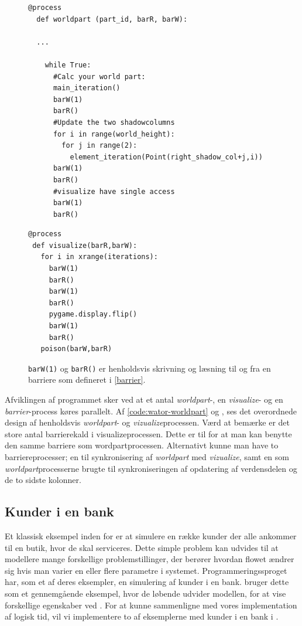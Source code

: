 \begin{figure}[hbtp]
\begin{minipage}{\linewidth}
\begin{lstlisting}[label=code:wator-worldpart,caption=Uddrag af processen 
  \emph{worldpart} i Wator]
  @process
  def worldpart (part_id, barR, barW):
  
  ...
  
    while True:
      #Calc your world part:
      main_iteration()
      barW(1)
      barR()
      #Update the two shadowcolumns
      for i in range(world_height):
        for j in range(2):
          element_iteration(Point(right_shadow_col+j,i))
      barW(1)
      barR()
      #visualize have single access
      barW(1)
      barR()
\end{lstlisting}

\begin{lstlisting}[label=code:wator-visualize,caption=Processen 
  \emph{visualize} i Wator]
@process
 def visualize(barR,barW):
   for i in xrange(iterations):
     barW(1)
     barR()
     barW(1)
     barR()
     pygame.display.flip()
     barW(1)
     barR()
   poison(barW,barR)
\end{lstlisting}

\end{minipage}
\caption[test]{\texttt{barW(1)} og \texttt{barR()} er henholdsvis skrivning og læsning til og 
fra en barriere som defineret i \cref{barrier}.}
\end{figure}
Afviklingen af programmet sker ved at et antal \emph{worldpart}-, en 
\emph{visualize}- og en \emph{barrier}-process køres parallelt. Af 
\autoref{code:wator-worldpart} og \pageref{code:wator-visualize}, ses det 
overordnede design af henholdsvis \emph{worldpart}- og 
\emph{vizualize}processen.  Værd at bemærke er det store antal barrierekald i 
visualizeprocessen. Dette er til for at man kan benytte den samme barriere som 
wordpartprocessen. Alternativt kunne man have to barriereprocesser; en til 
synkronisering af \emph{worldpart} med \emph{vizualize}, samt en som 
\emph{worldpart}processerne brugte til synkroniseringen af opdatering af 
verdensdelen og de to sidste kolonner. 



\subsection{Kunder i en bank}\label{bank-eksempel}
Et klassisk eksempel inden for \des er at simulere  en række kunder der alle 
ankommer til en butik, hvor de skal serviceres. Dette simple problem kan 
udvides til at modellere mange forskellige problemstillinger, der berører 
hvordan flowet ændrer sig hvis man varier en eller flere parametre
i systemet. Programmeringssproget \simpy{}har, som et af deres 
eksempler, en simulering af kunder i en bank. \simpy bruger dette som et 
gennemgående eksempel, hvor de løbende udvider modellen, for at vise 
forskellige egenskaber ved \simpy. For at kunne sammenligne \simpy  med vores 
implementation af logisk tid, vil vi implementere to af eksemplerne med kunder 
i en bank i \pycsp.

